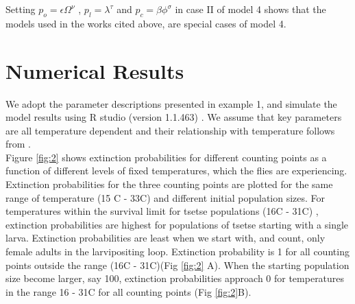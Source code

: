 \documentclass[smallextended]{svjour3}
\begin{document}
Setting  $ p_{o}= \epsilon \Omega^{\nu}$ , $p_{l} =\lambda^{\tau} $  and $p_{c} = \beta \phi^{\sigma} $ in case II of model 4 shows that the models used in the works cited above, are special cases of model 4. 



\section{Numerical Results}

We adopt the parameter descriptions presented in example 1, and simulate the model results using R studio (version 1.1.463) \cite{RStudioTeam2016}. We assume that key parameters are all temperature dependent and their relationship with temperature follows from \cite{Lord2018,PhelpsR.J.&Burrows,Hargrove2004a,Hargrove2019a}.\\


Figure \ref{fig:2} shows extinction probabilities for different counting points as a function of different levels of fixed temperatures, which the flies are experiencing. Extinction probabilities for the three counting points are plotted for the same range of temperature (15 \degree C - 33\degree C) and different initial population sizes. For temperatures within the survival limit for tsetse populations (16\degree C - 31\degree C) \cite{Are2019}, extinction probabilities are highest for populations of tsetse starting with a single larva. Extinction probabilities are least when we start with, and count, only female adults in the larvipositing loop. Extinction probability is 1 for all counting points outside the range (16\degree C - 31\degree C)(Fig \ref{fig:2} A).  When the starting population size become larger, say 100, extinction probabilities approach 0 for temperatures in the range  16 - 31\degree C for all counting points (Fig \ref{fig:2}B).
\end{document}
